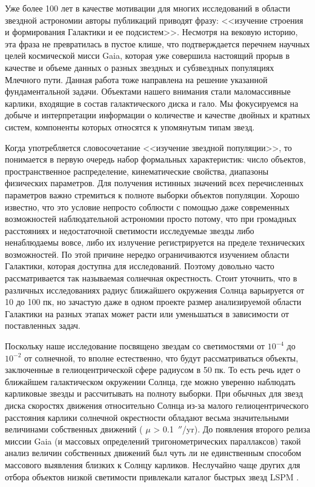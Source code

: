 {\actuality} Уже более 100 лет в качестве мотивации для многих исследований в области звездной астрономии авторы публикаций приводят фразу: <<изучение строения и формирования Галактики и ее подсистем>>. Несмотря на вековую историю, эта фраза не превратилась в пустое клише, что подтверждается перечнем научных целей космической мисси Gaia, которая уже совершила настоящий прорыв в качестве и объеме данных о разных звездных и субзвездных популяциях Млечного пути. Данная работа тоже направлена на решение указанной фундаментальной задачи. Объектами нашего внимания стали маломассивные карлики, входящие в состав галактического диска и гало. Мы фокусируемся на добыче и интерпретации информации о количестве и качестве двойных и кратных систем, компоненты которых относятся к упомянутым типам звезд.

Когда употребляется словосочетание <<изучение звездной популяции>>, то понимается в первую очередь набор формальных характеристик: число объектов, пространственное распределение, кинематические свойства, диапазоны физических параметров. Для получения истинных значений всех перечисленных параметров важно стремиться к полноте выборки объектов популяции. Хорошо известно, что это условие непросто соблюсти с помощью даже современных возможностей наблюдательной астрономии просто потому, что при громадных расстояниях и недостаточной светимости исследуемые звезды либо ненаблюдаемы вовсе, либо их излучение регистрируется на пределе технических возможностей. По этой причине нередко ограничиваются изучением области Галактики, которая доступна для исследований. Поэтому довольно часто рассматривается так называемая солнечная окрестность. Стоит уточнить, что в различных исследованиях радиус ближайшего окружения  Солнца варьируется от 10 до 100 пк, но зачастую даже в одном проекте размер анализируемой области Галактики на разных этапах может расти или уменьшаться в зависимости от поставленных задач.

Поскольку наше исследование посвящено звездам со светимостями от $10^{-4}$ до $10^{-2}$ от солнечной, то вполне естественно, что будут рассматриваться объекты, заключенные в гелиоцентрической сфере радиусом в 50 пк. То есть речь идет о ближайшем галактическом окружении Солнца, где можно уверенно наблюдать карликовые звезды и рассчитывать на полноту выборки. При обычных для звезд диска скоростях движения относительно Солнца из-за малого гелиоцентрического расстояния карлики солнечной окрестности обладают весьма значительными величинами собственных движений ( $\mu$ > 0.1~$''$/yr). До появления второго релиза миссии Gaia (и массовых определений тригонометрических параллаксов) такой анализ величин собственных движений был чуть ли не единственным способом массового выявления близких к Солнцу карликов. Неслучайно чаще других для отбора объектов низкой светимости привлекали каталог быстрых звезд LSPM . 
 
